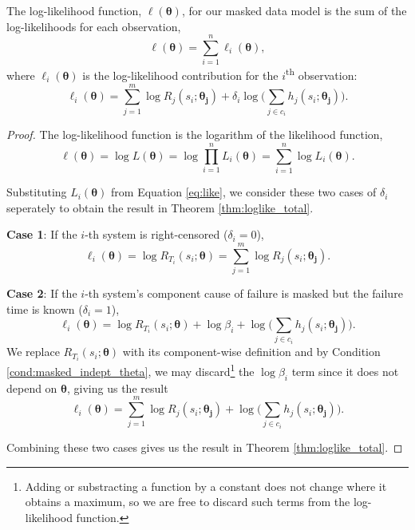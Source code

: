 \documentclass[
]{article}
\begin{document}
\begin{theorem}
\label{thm:loglike_total}
The log-likelihood function, $\ell(\boldsymbol{\theta})$, for our masked data model is the sum of the log-likelihoods for each observation,
\begin{equation}
\label{eq:loglike}
\ell(\boldsymbol{\theta}) = \sum_{i=1}^n \ell_i(\boldsymbol{\theta}),
\end{equation}
where $\ell_i(\boldsymbol{\theta})$ is the log-likelihood contribution for the $i$\textsuperscript{th} observation:
\begin{equation}
\ell_i(\boldsymbol{\theta}) = \sum_{j=1}^m \log R_j(s_i;\boldsymbol{\theta_j}) +
    \delta_i \log \bigl(\sum_{j\in c_i} h_j(s_i;\boldsymbol{\theta_j}) \bigr).
\end{equation}
\end{theorem}
\begin{proof}
The log-likelihood function is the logarithm of the likelihood function,
$$
\ell(\boldsymbol{\theta}) = \log L(\boldsymbol{\theta}) = \log \prod_{i=1}^n L_i(\boldsymbol{\theta}) = \sum_{i=1}^n \log L_i(\boldsymbol{\theta}).
$$

Substituting $L_i(\boldsymbol{\theta})$ from Equation \eqref{eq:like}, we consider these two cases of $\delta_i$
seperately to obtain the result in Theorem \ref{thm:loglike_total}.

\textbf{Case 1}: If the $i$-th system is right-censored ($\delta_i = 0$),
$$
\ell_i(\boldsymbol{\theta}) = \log R_{T_i}(s_i;\boldsymbol{\theta}) = \sum_{j=1}^m \log R_j(s_i;\boldsymbol{\theta_j}).
$$

\textbf{Case 2}: If the $i$-th system's component cause of failure is masked but the failure time is known ($\delta_i = 1$),
$$
\ell_i(\boldsymbol{\theta}) = \log R_{T_i}(s_i;\boldsymbol{\theta}) + \log \beta_i + \log \bigl(\sum_{j\in c_i} h_j(s_i;\boldsymbol{\theta_j})\bigr).
$$
We replace $R_{T_i}(s_i;\boldsymbol{\theta})$ with its component-wise definition and by Condition \ref{cond:masked_indept_theta},
we may discard\footnote{Adding or substracting a function by a constant does not change where it obtains a maximum, so we
are free to discard such terms from the log-likelihood function.} the $\log \beta_i$ term since it does not depend on
$\boldsymbol{\theta}$, giving us the result
$$
\ell_i(\boldsymbol{\theta}) = \sum_{j=1}^m \log R_j(s_i;\boldsymbol{\theta_j}) + \log \bigl(\sum_{j\in c_i} h_j(s_i;\boldsymbol{\theta_j}) \biggr).
$$

Combining these two cases gives us the result in Theorem \ref{thm:loglike_total}.
\end{proof}
\end{document}
